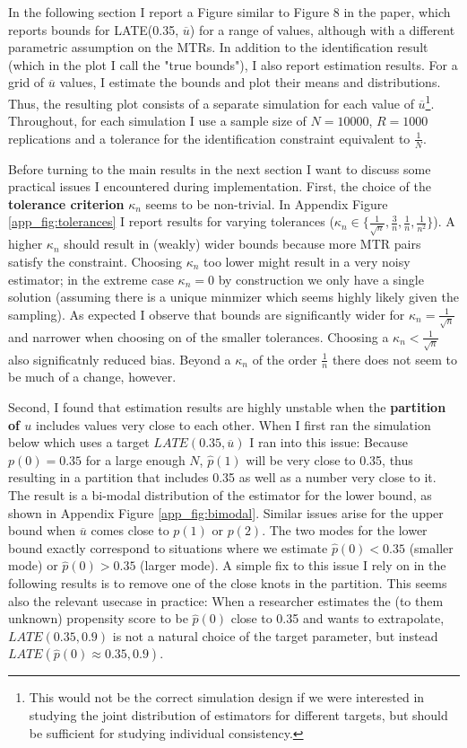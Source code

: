 \documentclass[11pt, a4paper, leqno]{article}
\begin{document}
In the following section I report a Figure similar to Figure 8 in the paper, which reports bounds for LATE(0.35, $\overline{u}$) for a range of values, although with a different parametric assumption on the MTRs.
In addition to the identification result (which in the plot I call the "true bounds"), I also report estimation results.
For a grid of $\overline{u}$ values, I estimate the bounds and plot their means and distributions. Thus, the resulting plot consists of a separate simulation for each value of $\overline{u}$\footnote{This would not be the correct simulation design if we were interested in studying the joint distribution of estimators for different targets, but should be sufficient for studying individual consistency.}.
Throughout, for each simulation I use a sample size of $N=10000$, $R=1000$ replications and a tolerance for the identification constraint equivalent to $\frac{1}{N}$.

Before turning to the main results in the next section I want to discuss some practical issues I encountered during implementation.
First, the choice of the \textbf{tolerance criterion} $\kappa_n$ seems to be non-trivial. In Appendix Figure \ref{app_fig:tolerances} I report results for varying tolerances ($\kappa_n \in \{\frac{1}{\sqrt{n}}, \frac{3}{n}, \frac{1}{n}, \frac{1}{n^2}\}$).
A higher $\kappa_n$ should result in (weakly) wider bounds because more MTR pairs satisfy the constraint. Choosing $\kappa_n$ too lower might result in a very noisy estimator; in the extreme case $\kappa_n = 0$ by construction we only have a single solution (assuming there is a unique minmizer which seems highly likely given the sampling).
As expected I observe that bounds are significantly wider for $\kappa_n = \frac{1}{\sqrt{n}}$ and narrower when choosing on of the smaller tolerances. Choosing a $\kappa_n<\frac{1}{\sqrt{n}}$ also significatnly reduced bias.
Beyond a $\kappa_n$ of the order $\frac{1}{n}$ there does not seem to be much of a change, however.

Second, I found that estimation results are highly unstable when the \textbf{partition of $u$} includes values very close to each other.
When I first ran the simulation below which uses a target $LATE(0.35, \overline{u})$ I ran into this issue:
Because $p(0) = 0.35$ for a large enough $N$, $\hat{p}(1)$ will be very close to 0.35, thus resulting in a partition that includes 0.35 as well as a number very close to it.
The result is a bi-modal distribution of the estimator for the lower bound, as shown in Appendix Figure \ref{app_fig:bimodal}. Similar issues arise for the upper bound when $\overline{u}$ comes close to $p(1)$ or $p(2)$.
The two modes for the lower bound exactly correspond to situations where we estimate $\hat{p}(0) < 0.35$ (smaller mode) or $\hat{p}(0) > 0.35$ (larger mode).
A simple fix to this issue I rely on in the following results is to remove one of the close knots in the partition.
This seems also the relevant usecase in practice: When a researcher estimates the (to them unknown) propensity score to be $\hat{p}(0)$ close to 0.35 and wants to extrapolate, $LATE(0.35, 0.9)$ is not a natural choice of the target parameter, but instead $LATE(\hat{p}(0)\approx0.35, 0.9)$.
\end{document}
